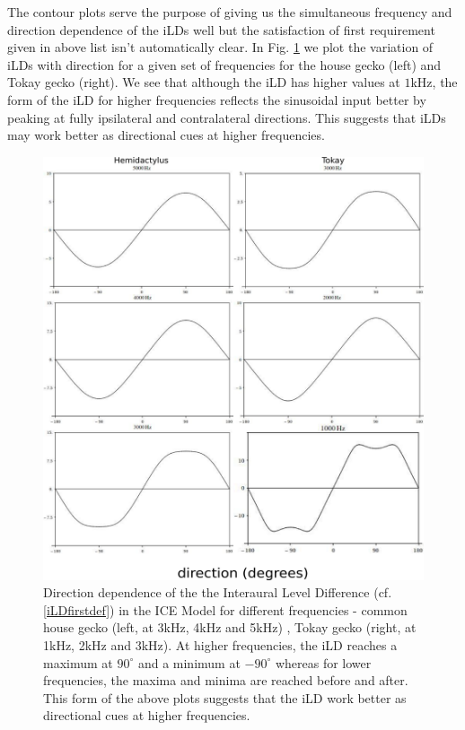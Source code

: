 The contour plots serve the purpose of giving us the simultaneous frequency and direction dependence of the iLDs well but the 
satisfaction of first requirement given in above list isn't automatically clear. In Fig. \ref{iLDdirection} we plot the variation
of iLDs with direction for a given set of frequencies for the house gecko (left) and Tokay gecko (right). We see that although the 
iLD has higher values at $1$kHz, the form of the iLD for higher frequencies reflects the sinusoidal input better by peaking at fully
ipsilateral and contralateral directions. This suggests that iLDs may work better as directional cues at higher frequencies.
\begin{figure}[ht!]
\centering
  \includegraphics[width=.5\linewidth]{Diagrams/Plots/iLD/all.png}
  \caption[Direction dependence of the Interaural Level Difference for different frequencies.]{Direction dependence of the the Interaural Level Difference (cf. \eqref{iLDfirstdef}) in the ICE Model for different frequencies - common house gecko (left, at 3kHz, 4kHz and 5kHz)
  , Tokay gecko (right, at 1kHz, 2kHz and 3kHz). At higher frequencies, the iLD reaches a maximum at $90^\circ$ and a minimum at $-90^\circ$ whereas for lower frequencies, the maxima and minima are 
  reached before and after. This form of the above plots suggests that the iLD work better as directional cues at higher frequencies.}
  \label{iLDdirection}
\end{figure}
% 
% 

